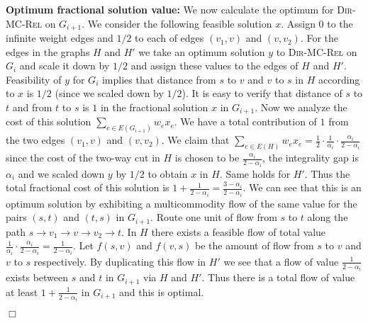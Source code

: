 \documentclass[11pt]{article}
\renewenvironment{proof}{\vspace{-0.1in}\noindent{\bf Proof:}}{\hspace*{\fill}$\Box$\par}
\def\DirMCRel{\textsc{Dir-MC-Rel}\xspace}
\begin{document}
\begin{proof}
  \noindent\textbf{Optimum fractional solution value:} We now 
  calculate the optimum for \DirMCRel on $G_{i+1}$. We consider the
  following feasible solution $x$. Assign $0$ to the infinite weight
  edges and $1/2$ to each of edges $(v_1,v)$ and $(v,v_2)$. For the
  edges in the graphs $H$ and $H'$ we take an optimum solution $y$ to
  \DirMCRel on $G_i$ and scale it down by $1/2$ and assign these
  values to the edges of $H$ and $H'$. Feasibility of $y$ for $G_i$
  implies that distance from $s$ to $v$ and $v$ to $s$ in $H$
  according to $x$ is $1/2$ (since we scaled down by $1/2$). It is
  easy to verify that distance of $s$ to $t$ and from $t$ to $s$ is
  $1$ in the fractional solution $x$ in $G_{i+1}$. Now we analyze the
  cost of this solution $\sum_{e \in E(G_{i+1})} w_e x_e$.  We have a
  total contribution of $1$ from the two edges $(v_1,v)$ and
  $(v,v_2)$.  We claim that $\sum_{e \in E(H)} w_e x_e = \frac{1}{2}
  \cdot \frac{1}{\alpha_i} \cdot \frac{\alpha_i}{2-\alpha_i}$ since
  the cost of the two-way cut in $H$ is chosen to be
  $\frac{\alpha_i}{2-\alpha_i}$, the integrality gap is
  $\alpha_i$ and we scaled down $y$ by $1/2$ to obtain $x$
  in $H$. Same holds for $H'$.  Thus the total fractional cost of this
  solution is $1 + \frac{1}{2-\alpha_i} = \frac{3- \alpha_i}{2-
    \alpha_i}$. We can see that this is an optimum solution by
  exhibiting a multicommodity flow of the same value for the pairs
  $(s,t)$ and $(t,s)$ in $G_{i+1}$. Route one unit of flow from $s$ to
  $t$ along the path $s \rightarrow v_1 \rightarrow v \rightarrow v_2
  \rightarrow t$. In $H$ there exists a feasible flow of total value
  $\frac{1}{\alpha_i} \cdot \frac{\alpha_i}{2-\alpha_i} =
  \frac{1}{2-\alpha_i}$. Let $f(s,v)$ and $f(v,s)$ be the amount of
  flow from $s$ to $v$ and $v$ to $s$ respectively. By duplicating this
  flow in $H'$ we see that a flow of value $\frac{1}{2-\alpha_i}$
  exists between $s$ and $t$ in $G_{i+1}$ via $H$ and $H'$. Thus there
  is a total flow of value at least $1 + \frac{1}{2-\alpha_i}$ in $G_{i+1}$
  and this is optimal.
  

\iffalse
  \noindent\textbf{Maximum flow:} We now calculate the optimum for 
  \DirMCRel on $G_{i+1}$ which by duality is the same as the maximum
  multicommodity flow for the pairs $(s,t)$ and $(t,s)$ in $G_{i+1}$.
  It is easy to argue that there is an optimum flow in which one unit
  of flow is sent from $s$ to $t$ along the path $s \rightarrow v_1
  \rightarrow v  \rightarrow v_2 \rightarrow t$. We can thus focus on
  the maximum flow in $G - \{v_1,v_2\}$. In this graph all flow from
  has to go through $x$. Thus if $f(s,t)$ is flow from $s$ to $t$ and
  $f(t,s)$ from $t$ to $s$ then we see that this is feasible if and
  only if there is a feasible flow in $H$ that simultaneously routes
  $f(s,x)$ flow from $s$ to $x$ and $f(t,s)$ flow from $x$ to $s$. In
  other words, the maximum flow possible in $G - \{v_1,v_2\}$ is
  exactly the same as the maximum flow in $H$ which is a scaled copy
  of $G_i$.  By induction this is $\frac{\alpha_i}{2-\alpha_i} \cdot
  \frac{1}{\alpha_i}$. Thus the maximum flow in $G_{i+1}$ is
   $1 + \frac{1}{2-\alpha_i} = \frac{3-
    \alpha_i}{2- \alpha_i}$.
\fi
 

\end{proof}
\end{document}

